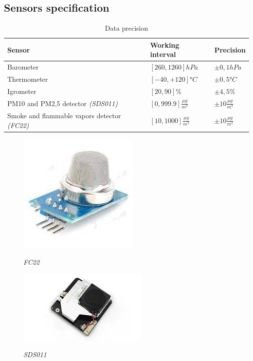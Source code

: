 \documentclass[12pt, a4paper]{article}
\begin{document}
\subsection{Sensors specification}
\begin{table}[H]
	\caption{Data precision}
	\begin{tabular}{|l|l|l|}
		\hline
		Sensor & Working interval & Precision\\
		\hline
		\hline
		Barometer & $[260,1260]hPa$ & $\pm0,1hPa$\\
		\hline
		Thermometer & $[-40,+120]°C$ & $\pm 0,5 °C$\\
		\hline
		Igrometer & $[20,90]\%$ & $\pm 4,5\%$\\
		\hline
		PM10 and PM2,5 detector \emph{(SDS011)}& $[0,999.9]\frac{\mu g}{m^3}$ & $\pm 10\frac{\mu g}{m^3}$\\
		\hline
		Smoke and flammable vapors detector \emph{(FC22)} &$[10,1000]\frac{\mu g}{m^3}$ & $\pm 10\frac{\mu g}{m^3}$\\
		\hline
	\end{tabular}
\end{table}
\clearpage
\begin{figure}[H]
	\centering
	\includegraphics[]{FC22.png}\\
	\caption{\emph{FC22}}
	\label{fig:fc22}
\end{figure}
	\begin{figure}[H]
	\centering
	\includegraphics[]{sds011.jpg}\\
	\caption{\emph{SDS011}}
	\label{fig:sds011}
\end{figure}
\end{document}
